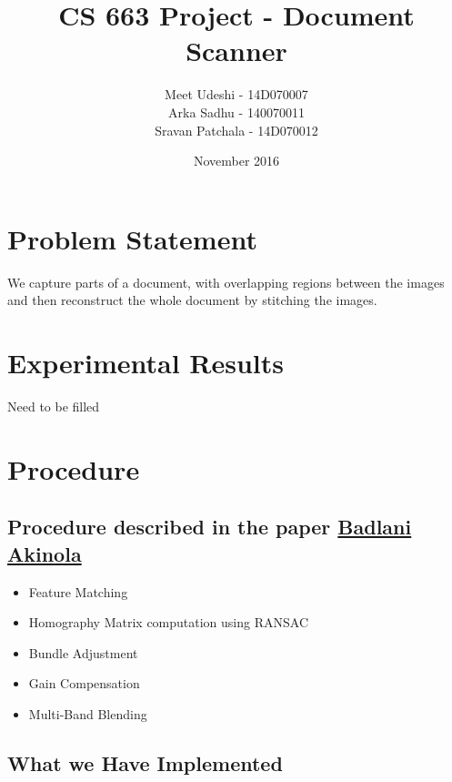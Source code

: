 \documentclass{article}
\title{CS 663 Project - Document Scanner}
\author{Meet Udeshi - 14D070007\\
Arka Sadhu - 140070011\\
Sravan Patchala - 14D070012\\
}
\date{November 2016}
\begin{document}
\maketitle
 
\section*{Problem Statement}

We capture parts of a document, with overlapping regions between the images and then reconstruct the  whole document by stitching the images.

\section*{Experimental Results}
Need to be filled

\section*{Procedure}

\subsection*{Procedure described in the paper 
\href{https://stacks.stanford.edu/file/druid:bf950qp8995/Badlani_Akinola_Li.pdf}{Badlani Akinola}}

\begin{itemize}
\item Feature Matching
\item Homography Matrix computation using RANSAC
\item Bundle Adjustment
\item Gain Compensation
\item Multi-Band Blending
\end{itemize}

\subsection*{What we Have Implemented}
\end{document}
